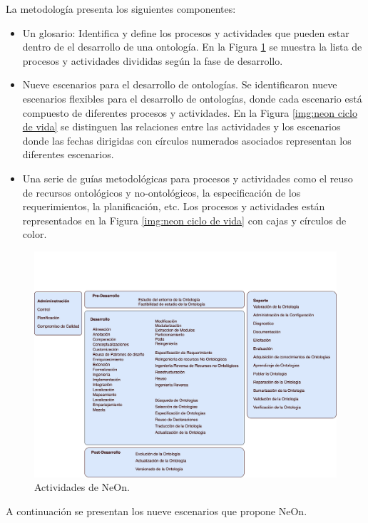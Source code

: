 La metodología presenta los siguientes componentes:
\begin{itemize}
    \item Un glosario: Identifica y define los procesos y actividades que pueden estar dentro de el desarrollo de una ontología. En la Figura \ref{img:neon actividades} se muestra la lista de procesos y actividades divididas según la fase de desarrollo.
    \item Nueve escenarios para el desarrollo de ontologías. Se identificaron nueve escenarios flexibles para el desarrollo de ontologías, donde cada escenario está compuesto de diferentes procesos y actividades. En la Figura \ref{img:neon ciclo de vida} se distinguen las relaciones entre las actividades y los escenarios donde las fechas dirigidas con círculos numerados asociados representan los diferentes escenarios. 
    \item Una serie de guías metodológicas para procesos y actividades como el reuso de recursos ontológicos y no-ontológicos, la especificación de los requerimientos, la planificación, etc. Los procesos y actividades están representados en la Figura \ref{img:neon ciclo de vida} con cajas y círculos de color.
\end{itemize}

\begin{figure}[h!]
    \centering
    \includegraphics[width=150mm]{figuras/Diagramas-NeonActivities}
    \caption{Actividades de NeOn. \cite{SurezFigueroa2017Chapter2T}}
    \label{img:neon actividades}
    \end{figure}

A continuación se presentan los nueve escenarios que propone NeOn.

